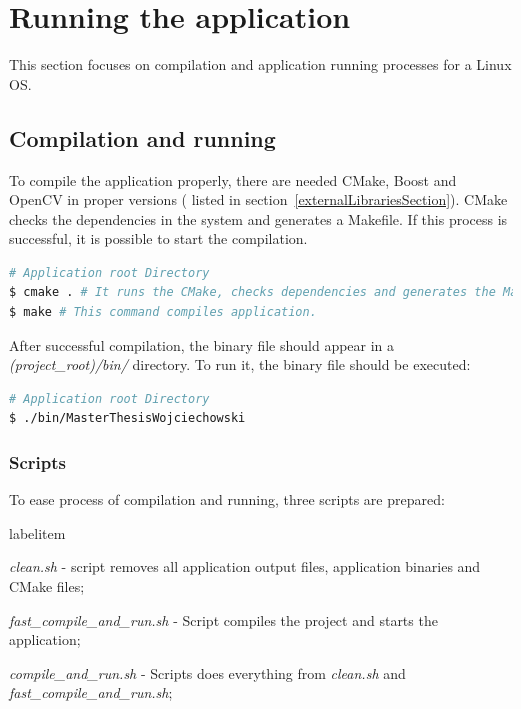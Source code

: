 \documentclass[a4paper,onecolumn,oneside,12pt]{memoir}
\makeatletter
\renewenvironment{itemize}{
  \begin{list}{  
  \csname labelitem\romannumeral\the\@listdepth\endcsname}{
  \setlength{\leftmargin}{1em}
	\setlength{\topsep}{6pt}%
	\setlength{\partopsep}{0pt}%
	\setlength{\parskip}{0pt}%
	\setlength{\parsep}{0pt}%
	\setlength{\itemsep}{0pt}}
}{
  \end{list}
}
\makeatother
\begin{document}
\section{Running the application}

This section focuses on compilation and application running processes for a Linux OS.

\subsection{Compilation and running}

To compile the application properly, there are needed CMake, Boost and OpenCV in proper versions (
listed in section~\ref{externalLibrariesSection}). CMake checks the dependencies in the system and
generates a Makefile. If this process is successful, it is possible to start the compilation.

\begin{lstlisting}[language=sh, caption=Commands needed for building the application]
# Application root Directory
$ cmake . # It runs the CMake, checks dependencies and generates the Makefile
$ make # This command compiles application.
\end{lstlisting}

After successful compilation, the binary file should appear in a \textit{(project\_root)/bin/}
directory. To run it, the binary file should be executed:

\begin{lstlisting}[language=sh, caption=Commands needed for running the application]
# Application root Directory
$ ./bin/MasterThesisWojciechowski
\end{lstlisting}

\subsubsection{Scripts}

To ease process of compilation and running, three scripts are prepared:

\begin{itemize}
  \item \textit{clean.sh} - script removes all application output files, application binaries and
        CMake files;
  \item \textit{fast\_compile\_and\_run.sh} - Script compiles the project and starts the application;
  \item \textit{compile\_and\_run.sh} - Scripts does everything from \textit{clean.sh} and
        \textit{fast\_compile\_and\_run.sh};
\end{itemize}
\end{document}
